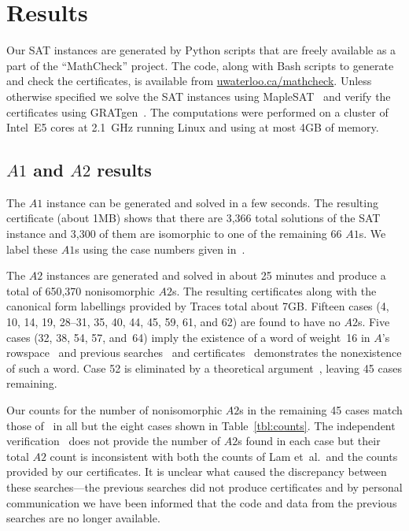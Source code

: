 \documentclass[letterpaper]{article}
\begin{document}
\section{Results}\label{sec:results}

Our SAT instances are generated by Python scripts that
are freely available as a part of the ``MathCheck'' project.  The
code, along with Bash scripts to generate and check the
certificates, is available from \url{uwaterloo.ca/mathcheck}.
Unless otherwise specified we solve the SAT
instances using MapleSAT~\cite{liang2016exponential}
and verify the certificates using
GRATgen~\cite{lammich2017efficient}.
The computations were performed on a cluster of Intel~E5
cores at 2.1~GHz running Linux and using at most 4GB of memory.

\subsection{\boldmath$A1$ and $A2$ results}

The $A1$ instance can be generated and solved
in a few seconds.  The resulting
certificate (about 1MB) shows that there are 3,366 total
solutions of the SAT instance and 3,300 of them are
isomorphic to one of the remaining 66 $A1$s.
We label these $A1$s using the case numbers given
in~\cite{kaski2006classification}.

The $A2$ instances are generated and solved
in about 25 minutes and produce a total of 650,370 nonisomorphic
$A2$s.
The resulting certificates
along with the canonical form labellings provided by Traces
total about 7GB.  Fifteen cases (4, 10, 14, 19, 28--31, 35, 40, 44, 45, 59,
61, and 62) are found to have no $A2$s.
Five cases (32, 38, 54, 57, and~64) imply the existence
of a word of weight~16 in $A$'s rowspace~\cite{lam1985estimates}
and previous searches~\cite{carter1974existence,lam1986nonexistence}
and certificates~\cite{bright2020unsatisfiability}
demonstrates the nonexistence of such a word.  Case 52 is
eliminated by a theoretical argument~\cite{lam1985estimates},
leaving 45 cases remaining.

Our counts for the number of nonisomorphic $A2$s in the remaining 45 cases
match those of~\cite{lam1989non} in all but the eight cases
shown in Table~\ref{tbl:counts}.  The independent
verification~\cite{roy2011confirmation}
does not provide the number of $A2$s found in each case
but their total $A2$ count is inconsistent
with both the counts of Lam et~al.~and the counts
provided by our certificates.
It is unclear what caused the discrepancy between these
searches---the previous searches did not produce certificates
and by personal communication we have been informed
that the code and data from the
previous searches are no longer available.
\end{document}
